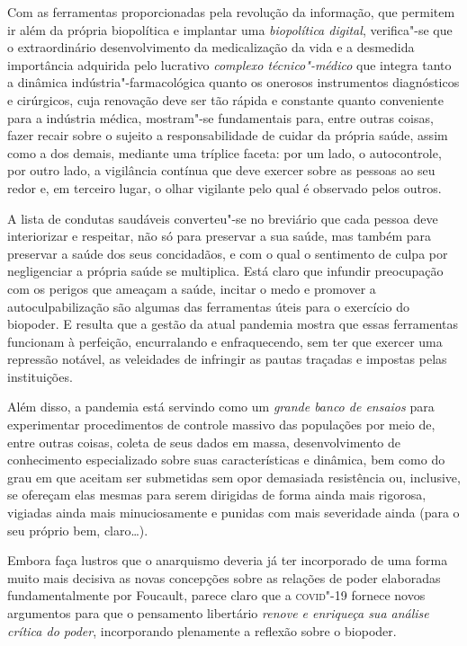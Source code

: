 Com as ferramentas proporcionadas pela revolução da informação, que
permitem ir além da própria biopolítica e implantar uma
\textit{biopolítica digital}, verifica"-se que o extraordinário
desenvolvimento da medicalização da vida e a desmedida importância
adquirida pelo lucrativo \textit{complexo técnico"-médico} que integra
tanto a dinâmica indústria"-farmacológica quanto os onerosos instrumentos
diagnósticos e cirúrgicos, cuja renovação deve ser tão rápida e
constante quanto conveniente para a indústria médica, mostram"-se
fundamentais para, entre outras coisas, fazer recair sobre o sujeito a
responsabilidade de cuidar da própria saúde, assim como a dos demais,
mediante uma tríplice faceta: por um lado, o autocontrole, por outro
lado, a vigilância contínua que deve exercer sobre as pessoas ao seu
redor e, em terceiro lugar, o olhar vigilante pelo qual é observado
pelos outros.

A lista de condutas saudáveis converteu"-se no breviário que cada pessoa
deve interiorizar e respeitar, não só para preservar a sua saúde, mas
também para preservar a saúde dos seus concidadãos, e com o qual o
sentimento de culpa por negligenciar a própria saúde se multiplica. Está
claro que infundir preocupação com os perigos que ameaçam a saúde,
incitar o medo e promover a autoculpabilização são algumas das
ferramentas úteis para o exercício do biopoder. E resulta que a gestão
da atual pandemia mostra que essas ferramentas funcionam à perfeição,
encurralando e enfraquecendo, sem ter que exercer uma repressão notável,
as veleidades de infringir as pautas traçadas e impostas pelas
instituições.

Além disso, a pandemia está servindo como um \textit{grande banco de
ensaios} para experimentar procedimentos de controle massivo das
populações por meio de, entre outras coisas, coleta de seus dados em
massa, desenvolvimento de conhecimento especializado sobre suas
características e dinâmica, bem como do grau em que aceitam ser
submetidas sem opor demasiada resistência ou, inclusive, se ofereçam
elas mesmas para serem dirigidas de forma ainda mais rigorosa, vigiadas
ainda mais minuciosamente e punidas com mais severidade ainda (para o
seu próprio bem, claro\ldots{}).

Embora faça lustros que o anarquismo deveria já ter incorporado de uma
forma muito mais decisiva as novas concepções sobre as relações de poder
elaboradas fundamentalmente por Foucault, parece claro que a \textsc{covid}"-19
fornece novos argumentos para que o pensamento libertário \textit{renove
e enriqueça sua análise crítica do poder}, incorporando plenamente a
reflexão sobre o biopoder.

